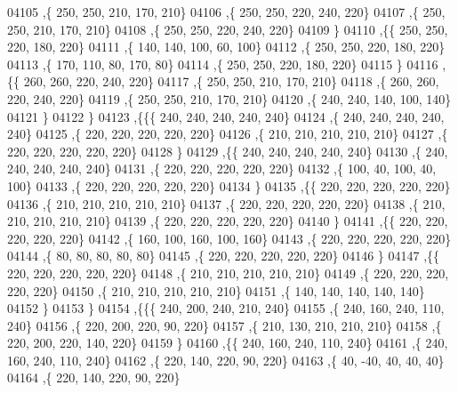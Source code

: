 \begin{DoxyCode}
04105     ,\{   250,   250,   210,   170,   210\}
04106     ,\{   250,   250,   220,   240,   220\}
04107     ,\{   250,   250,   210,   170,   210\}
04108     ,\{   250,   250,   220,   240,   220\}
04109     \}
04110    ,\{\{   250,   250,   220,   180,   220\}
04111     ,\{   140,   140,   100,    60,   100\}
04112     ,\{   250,   250,   220,   180,   220\}
04113     ,\{   170,   110,    80,   170,    80\}
04114     ,\{   250,   250,   220,   180,   220\}
04115     \}
04116    ,\{\{   260,   260,   220,   240,   220\}
04117     ,\{   250,   250,   210,   170,   210\}
04118     ,\{   260,   260,   220,   240,   220\}
04119     ,\{   250,   250,   210,   170,   210\}
04120     ,\{   240,   240,   140,   100,   140\}
04121     \}
04122    \}
04123   ,\{\{\{   240,   240,   240,   240,   240\}
04124     ,\{   240,   240,   240,   240,   240\}
04125     ,\{   220,   220,   220,   220,   220\}
04126     ,\{   210,   210,   210,   210,   210\}
04127     ,\{   220,   220,   220,   220,   220\}
04128     \}
04129    ,\{\{   240,   240,   240,   240,   240\}
04130     ,\{   240,   240,   240,   240,   240\}
04131     ,\{   220,   220,   220,   220,   220\}
04132     ,\{   100,    40,   100,    40,   100\}
04133     ,\{   220,   220,   220,   220,   220\}
04134     \}
04135    ,\{\{   220,   220,   220,   220,   220\}
04136     ,\{   210,   210,   210,   210,   210\}
04137     ,\{   220,   220,   220,   220,   220\}
04138     ,\{   210,   210,   210,   210,   210\}
04139     ,\{   220,   220,   220,   220,   220\}
04140     \}
04141    ,\{\{   220,   220,   220,   220,   220\}
04142     ,\{   160,   100,   160,   100,   160\}
04143     ,\{   220,   220,   220,   220,   220\}
04144     ,\{    80,    80,    80,    80,    80\}
04145     ,\{   220,   220,   220,   220,   220\}
04146     \}
04147    ,\{\{   220,   220,   220,   220,   220\}
04148     ,\{   210,   210,   210,   210,   210\}
04149     ,\{   220,   220,   220,   220,   220\}
04150     ,\{   210,   210,   210,   210,   210\}
04151     ,\{   140,   140,   140,   140,   140\}
04152     \}
04153    \}
04154   ,\{\{\{   240,   200,   240,   210,   240\}
04155     ,\{   240,   160,   240,   110,   240\}
04156     ,\{   220,   200,   220,    90,   220\}
04157     ,\{   210,   130,   210,   210,   210\}
04158     ,\{   220,   200,   220,   140,   220\}
04159     \}
04160    ,\{\{   240,   160,   240,   110,   240\}
04161     ,\{   240,   160,   240,   110,   240\}
04162     ,\{   220,   140,   220,    90,   220\}
04163     ,\{    40,   -40,    40,    40,    40\}
04164     ,\{   220,   140,   220,    90,   220\}

\end{DoxyCode}
